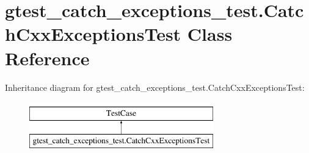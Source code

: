 \hypertarget{classgtest__catch__exceptions__test_1_1_catch_cxx_exceptions_test}{}\section{gtest\+\_\+catch\+\_\+exceptions\+\_\+test.\+Catch\+Cxx\+Exceptions\+Test Class Reference}
\label{classgtest__catch__exceptions__test_1_1_catch_cxx_exceptions_test}
Inheritance diagram for gtest\+\_\+catch\+\_\+exceptions\+\_\+test.\+Catch\+Cxx\+Exceptions\+Test\+:\begin{figure}[H]
\begin{center}
\leavevmode
\includegraphics[height=2.000000cm]{classgtest__catch__exceptions__test_1_1_catch_cxx_exceptions_test}
\end{center}
\end{figure}
